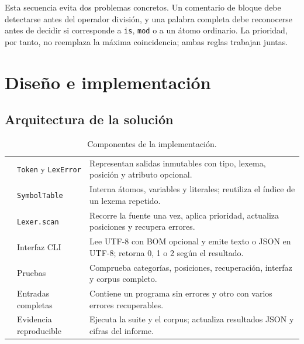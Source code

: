 Esta secuencia evita dos problemas concretos. Un comentario de bloque debe detectarse antes del operador división, y una palabra completa debe reconocerse antes de decidir si corresponde a \texttt{is}, \texttt{mod} o a un átomo ordinario. La prioridad, por tanto, no reemplaza la máxima coincidencia; ambas reglas trabajan juntas.

\section{Diseño e implementación}

\subsection{Arquitectura de la solución}

\begin{table}[H]
\centering
\small
\caption{Componentes de la implementación.}
\label{tab:arquitectura}
\begin{tabularx}{\textwidth}{L{3cm}L{3.6cm}Y}
\toprule
{} &  &  \\
\midrule
{} & \texttt{Token} y \texttt{LexError} & Representan salidas inmutables con tipo, lexema, posición y atributo opcional. \\
  & \texttt{SymbolTable} & Interna átomos, variables y literales; reutiliza el índice de un lexema repetido. \\
 & \texttt{Lexer.scan} & Recorre la fuente una vez, aplica prioridad, actualiza posiciones y recupera errores. \\
  & Interfaz CLI & Lee UTF-8 con BOM opcional y emite texto o JSON en UTF-8; retorna 0, 1 o 2 según el resultado. \\
 & Pruebas & Comprueba categorías, posiciones, recuperación, interfaz y corpus completo. \\
  & Entradas completas & Contiene un programa sin errores y otro con varios errores recuperables. \\
 & Evidencia reproducible & Ejecuta la suite y el corpus; actualiza resultados JSON y cifras del informe. \\
\bottomrule
\end{tabularx}
\end{table}

